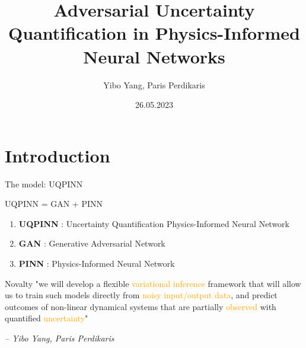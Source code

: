 \documentclass[aspectratio=169]{beamer}
\title{Adversarial Uncertainty Quantification in Physics-Informed Neural Networks}
\author{Yibo Yang, Paris Perdikaris}
\institute{University of Pennsylvania}
\date{26.05.2023}
\newcommand{\hs}[1]{\hspace*{#1cm}}
\begin{document}
\maketitle

\section{Introduction}

\begin{frame}{The model: UQPINN}
\begin{minipage}{0.6\textwidth}
{\huge UQPINN = GAN + PINN}
\end{minipage}\hfill
\begin{minipage}{0.4\textwidth}
\begin{enumerate}
    \item \textbf{UQPINN} : Uncertainty Quantification Physics-Informed Neural Network
    \item \textbf{GAN} : Generative Adversarial Network
    \item \textbf{PINN} : Physics-Informed Neural Network
\end{enumerate}
\end{minipage}
\end{frame}

\begin{frame}{Novalty}
"we will develop a flexible \textcolor{orange}{variational inference} framework 
that will allow us to train such models directly from \textcolor{orange}{noisy input/output data}, 
and predict outcomes of non-linear dynamical systems that are partially \textcolor{orange}{observed}
with quantified \textcolor{orange}{uncertainty}"
\hs{1}
\begin{flushright}
    \textit{-- Yibo Yang, Paris Perdikaris}
\end{flushright}
\hs{2}


\end{frame}
\end{document}

